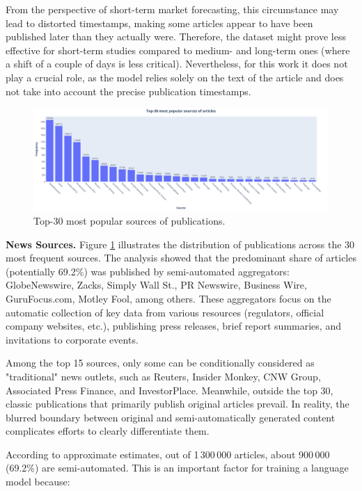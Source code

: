 From the perspective of short-term market forecasting, this circumstance may lead to distorted timestamps, making some articles appear
to have been published later than they actually were. Therefore, the dataset might prove less effective for short-term studies compared
to medium- and long-term ones (where a shift of a couple of days is less critical). Nevertheless, for this work it does not play
a crucial role, as the model relies solely on the text of the article and does not take into account the precise publication timestamps.

\begin{figure}[H]
    \centering
    \includegraphics[width=1\linewidth]{img/top30_sources.png}
    \caption{\label{fig:dist_sources}Top-30 most popular sources of publications.}
\end{figure}

\textbf{News Sources.} Figure \ref{fig:dist_sources} illustrates the distribution of publications across the 30 most frequent sources.
The analysis showed that the predominant share of articles (potentially 69.2\%) was published by semi-automated aggregators:
GlobeNewswire, Zacks, Simply Wall St., PR Newswire, Business Wire, GuruFocus.com, Motley Fool, among others. These aggregators focus
on the automatic collection of key data from various resources (regulators, official company websites, etc.), publishing press releases,
brief report summaries, and invitations to corporate events.

Among the top 15 sources, only some can be conditionally considered as "traditional" news outlets, such as Reuters, Insider Monkey,
CNW Group, Associated Press Finance, and InvestorPlace. Meanwhile, outside the top 30, classic publications that primarily publish
original articles prevail. In reality, the blurred boundary between original and semi-automatically generated content complicates
efforts to clearly differentiate them.

According to approximate estimates, out of 1\,300\,000 articles, about 900\,000 (69.2\%) are semi-automated. This is an important factor
for training a language model because:

